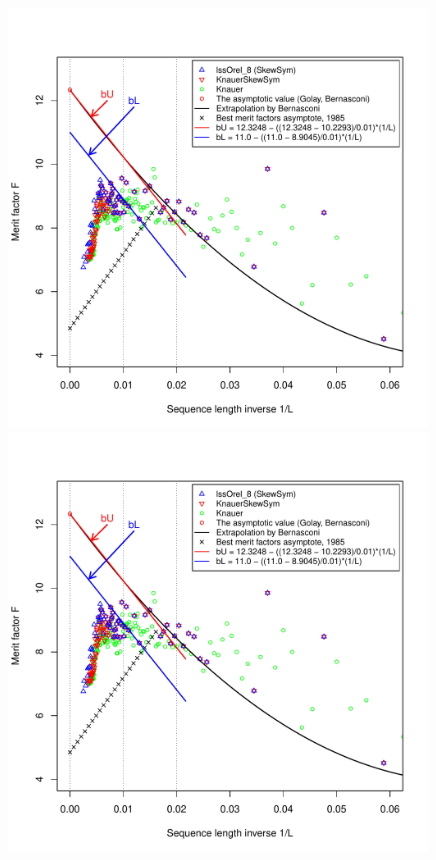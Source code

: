 \begin{figure}[t!]
\begin{minipage}{0.49\textwidth}
\includegraphics[width=0.99\textwidth]{fg-R-labs-wide-4-figures-b}
\vspace*{-5ex}%
\end{minipage}
\begin{minipage}{0.49\textwidth}
\includegraphics[width=0.99\textwidth]{fg-R-labs-wide-4-figures-b}

\end{minipage}
\end{figure}
